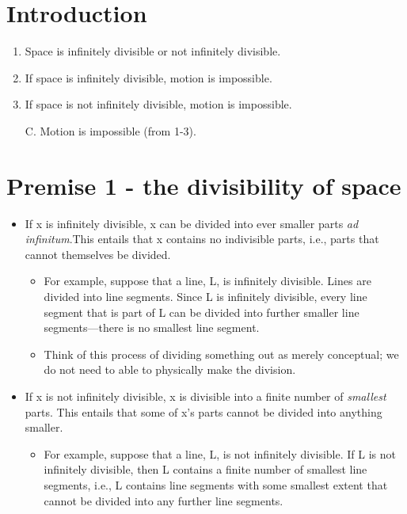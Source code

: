 \documentclass[oneside]{article}
\begin{document}
\thispagestyle{fancy}

\section*{Introduction}

\begin{enumerate}
\def\labelenumi{\arabic{enumi}.}
\item
  Space is infinitely divisible or not infinitely divisible.
\item
  If space is infinitely divisible, motion is impossible.
\item
  If space is not infinitely divisible, motion is impossible.
\item[C.]
  Motion is impossible (from 1-3).
\end{enumerate}

\section*{Premise 1 - the divisibility of
space}\label{premise-1---the-divisibility-of-space}

\begin{itemize}
\item
  If x is infinitely divisible, x can be divided into ever smaller parts
  \emph{ad infinitum}.This entails that x contains no indivisible parts,
  i.e., parts that cannot themselves be divided.

  \begin{itemize}
  \item
    For example, suppose that a line, L, is infinitely divisible. Lines
    are divided into line segments. Since L is infinitely divisible, every line segment that is part of L can be
    divided into further smaller line segments---there is no smallest
    line segment.
  \item
    Think of this process of dividing something out as merely
    conceptual; we do not need to able to physically make the division.
  \end{itemize}
\item
  If x is not infinitely divisible, x is divisible into a finite
  number of \emph{smallest} parts. This entails that some of x's parts cannot be divided into anything smaller. 

  \begin{itemize}
  \itemsep1pt\parskip0pt
  \item
    For example, suppose that a line, L, is not infinitely divisible.
    If L is not infinitely divisible, then L contains a finite number of smallest line segments, i.e., L contains
    line segments with some smallest extent that cannot be divided into
    any further line segments.
  \end{itemize}
\end{itemize}
\end{document}
